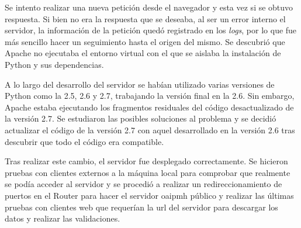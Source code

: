 Se intento realizar una nueva petición desde el navegador y esta vez si se obtuvo respuesta. Si bien no era la respuesta que se deseaba, al ser un error interno el servidor, la información de la petición quedó registrado en los \textit{logs}, por lo que fue más sencillo hacer un seguimiento hasta el origen del mismo. Se descubrió que Apache no ejecutaba el entorno virtual con el que se aislaba la instalación de Python y sus dependencias. 

A lo largo del desarrollo del servidor se habían utilizado varias versiones de Python como la 2.5, 2.6 y 2.7, trabajando la versión final en la 2.6. Sin embargo, Apache estaba ejecutando los fragmentos residuales del código desactualizado de la versión 2.7. Se estudiaron las posibles soluciones al problema y se decidió actualizar el código de la versión 2.7 con aquel desarrollado en la versión 2.6 tras descubrir que todo el código era compatible.

Tras realizar este cambio, el servidor fue desplegado correctamente. Se hicieron pruebas con clientes externos a la máquina local para comprobar que realmente se podía acceder al servidor y se procedió a realizar un redireccionamiento de puertos en el Router para hacer el servidor \acrshort{oaipmh} público y realizar las últimas pruebas con clientes web que requerían la \acrshort{url} del servidor para descargar los datos y realizar las validaciones.
